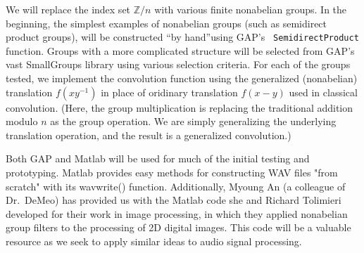 \documentclass[10pt]{article}
\begin{document}
\vskip5mm

We will replace the index set $\mathbb{Z}/n$ with various finite nonabelian
groups.  In the beginning, the simplest examples of nonabelian groups (such as
semidirect product groups), will be constructed ``by hand''using GAP's {\tt
  SemidirectProduct} function.  Groups with a more complicated structure will be
selected from GAP's vast SmallGroups library using various selection criteria.
For each of the groups tested, we implement the
convolution function using the generalized (nonabelian) translation $f(xy^{-1})$
in place of oridinary translation $f(x-y)$ used in classical convolution. (Here,
the group multiplication is replacing the traditional addition modulo $n$ as the
group operation.  We are simply generalizing the underlying translation
operation, and the result is a generalized convolution.)

Both GAP and Matlab will be used for much of the initial testing and
prototyping. Matlab provides easy methods for constructing WAV files "from
scratch" with its wavwrite() function. Additionally, Myoung An (a colleague of
Dr.~DeMeo) has provided us with the Matlab code she and Richard Tolimieri developed for
their work in image processing, in which they applied nonabelian group
filters to the processing of 2D digital images. This code will be a valuable
resource as we seek to apply similar ideas to audio signal processing.  
\end{document}
